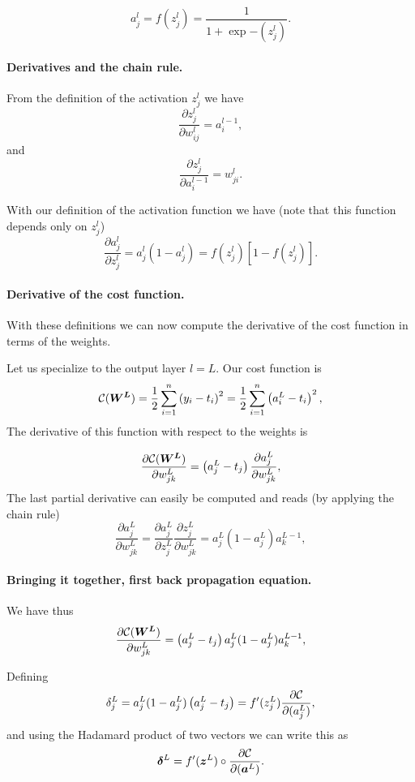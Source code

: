\documentclass[%
oneside,                 %
final,                   %
10pt]{article}
\begin{document}
\[
a_j^l = f(z_j^l) = \frac{1}{1+\exp{-(z_j^l)}}.
\]


\paragraph{Derivatives and the chain rule.}
From the definition of the activation $z_j^l$ we have
\[
\frac{\partial z_j^l}{\partial w_{ij}^l} = a_i^{l-1},
\]
and
\[
\frac{\partial z_j^l}{\partial a_i^{l-1}} = w_{ji}^l. 
\]

With our definition of the activation function we have (note that this function depends only on $z_j^l$)
\[
\frac{\partial a_j^l}{\partial z_j^{l}} = a_j^l(1-a_j^l)=f(z_j^l) \left[ 1-f(z_j^l) \right]. 
\]


\paragraph{Derivative of the cost function.}
With these definitions we can now compute the derivative of the cost function in terms of the weights.

Let us specialize to the output layer $l=L$. Our cost function is
\[
{\cal C}(\boldsymbol{W^L})  =  \frac{1}{2}\sum_{i=1}^n\left(y_i - t_i\right)^2=\frac{1}{2}\sum_{i=1}^n\left(a_i^L - t_i\right)^2, 
\]
The derivative of this function with respect to the weights is

\[
\frac{\partial{\cal C}(\boldsymbol{W^L})}{\partial w_{jk}^L}  =  \left(a_j^L - t_j\right)\frac{\partial a_j^L}{\partial w_{jk}^{L}}, 
\]
The last partial derivative can easily be computed and reads (by applying the chain rule)
\[
\frac{\partial a_j^L}{\partial w_{jk}^{L}} = \frac{\partial a_j^L}{\partial z_{j}^{L}}\frac{\partial z_j^L}{\partial w_{jk}^{L}}=a_j^L(1-a_j^L)a_k^{L-1},  
\]



\paragraph{Bringing it together, first back propagation equation.}
We have thus
\[
\frac{\partial{\cal C}(\boldsymbol{W^L})}{\partial w_{jk}^L}  =  \left(a_j^L - t_j\right)a_j^L(1-a_j^L)a_k^{L-1}, 
\]

Defining
\[
\delta_j^L = a_j^L(1-a_j^L)\left(a_j^L - t_j\right) = f'(z_j^L)\frac{\partial {\cal C}}{\partial (a_j^L)},
\]
and using the Hadamard product of two vectors we can write this as
\[
\boldsymbol{\delta}^L = f'(\boldsymbol{z}^L)\circ\frac{\partial {\cal C}}{\partial (\boldsymbol{a}^L)}.
\]
\end{document}
